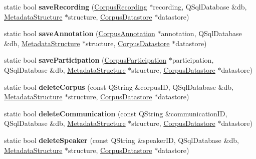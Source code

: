 \begin{DoxyCompactItemize}
static bool {\bfseries save\+Recording} (\hyperlink{class_corpus_recording}{Corpus\+Recording} $\ast$recording, Q\+Sql\+Database \&db, \hyperlink{class_metadata_structure}{Metadata\+Structure} $\ast$structure, \hyperlink{class_corpus_datastore}{Corpus\+Datastore} $\ast$datastore)
\item 
\mbox{\label{class_s_q_l_serialiser_metadata_a28d62999ba67544d84558ed022046e8d}} 
static bool {\bfseries save\+Annotation} (\hyperlink{class_corpus_annotation}{Corpus\+Annotation} $\ast$annotation, Q\+Sql\+Database \&db, \hyperlink{class_metadata_structure}{Metadata\+Structure} $\ast$structure, \hyperlink{class_corpus_datastore}{Corpus\+Datastore} $\ast$datastore)
\item 
\mbox{\label{class_s_q_l_serialiser_metadata_aeae5c09e017c488e6c4f54b176ccde22}} 
static bool {\bfseries save\+Participation} (\hyperlink{class_corpus_participation}{Corpus\+Participation} $\ast$participation, Q\+Sql\+Database \&db, \hyperlink{class_metadata_structure}{Metadata\+Structure} $\ast$structure, \hyperlink{class_corpus_datastore}{Corpus\+Datastore} $\ast$datastore)
\item 
\mbox{\label{class_s_q_l_serialiser_metadata_a19540391a708e492a41d623749f4c628}} 
static bool {\bfseries delete\+Corpus} (const Q\+String \&corpus\+ID, Q\+Sql\+Database \&db, \hyperlink{class_metadata_structure}{Metadata\+Structure} $\ast$structure, \hyperlink{class_corpus_datastore}{Corpus\+Datastore} $\ast$datastore)
\item 
\mbox{\label{class_s_q_l_serialiser_metadata_aa5b0dff4d0a695565405a96d8f7cd0cb}} 
static bool {\bfseries delete\+Communication} (const Q\+String \&communication\+ID, Q\+Sql\+Database \&db, \hyperlink{class_metadata_structure}{Metadata\+Structure} $\ast$structure, \hyperlink{class_corpus_datastore}{Corpus\+Datastore} $\ast$datastore)
\item 
\mbox{\label{class_s_q_l_serialiser_metadata_a53d6dada48d7def980ed3905ba392967}} 
static bool {\bfseries delete\+Speaker} (const Q\+String \&speaker\+ID, Q\+Sql\+Database \&db, \hyperlink{class_metadata_structure}{Metadata\+Structure} $\ast$structure, \hyperlink{class_corpus_datastore}{Corpus\+Datastore} $\ast$datastore)

\end{DoxyCompactItemize}
